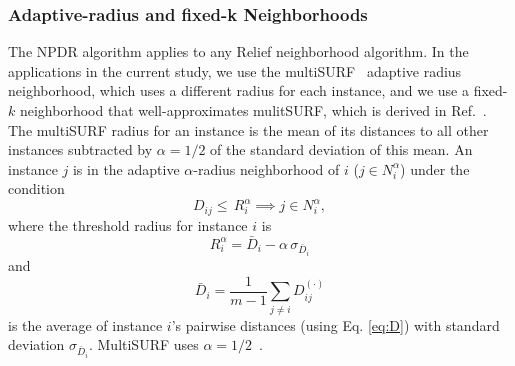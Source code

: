 \documentclass[10pt]{article}
\begin{document}

\subsubsection{Adaptive-radius and fixed-k Neighborhoods}
The NPDR algorithm applies to any Relief neighborhood algorithm. In the applications in the current study, we use the multiSURF~\cite{urbanowicz17} adaptive radius neighborhood, which uses a different radius for each instance, and we use a fixed-$k$ neighborhood that well-approximates mulitSURF, which is derived in Ref.~\cite{bod}. The multiSURF radius for an instance is the mean of its distances to all other instances subtracted by $\alpha=1/2$ of the standard deviation of this mean. 
An instance $j$ is in the adaptive $\alpha$-radius neighborhood of $i$ ($j \in N^{\alpha}_{i}$) under the condition
%
%
\begin{equation}
D_{ij} \le \, R_i^{\alpha} \implies j \in N^{\alpha}_{i},
\end{equation}
where the threshold radius for instance $i$ is
\begin{equation} 
R_i^{\alpha} =  \bar{D}_i - \alpha \, \sigma_{\bar{D}_i}
\end{equation}
and 
\begin{equation}
\bar{D}_i = \frac{1}{m-1} \sum_{j \ne i} D^{(\cdot)}_{ij}
\end{equation}
is the average of instance $i$'s pairwise distances (using Eq. \ref{eq:D}) with standard deviation $\sigma_{\bar{D}_i}$. MultiSURF uses $\alpha=1/2$~\cite{msurf13}. 
 
\end{document}
